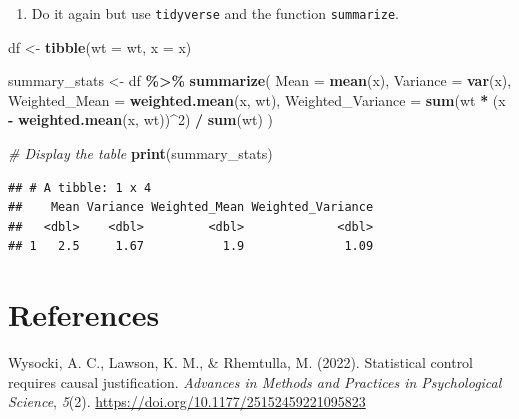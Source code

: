 \documentclass[
  doc]{apa6}
\newenvironment{Shaded}{\begin{snugshade}}{\end{snugshade}}
\newcommand{\AttributeTok}[1]{\textcolor[rgb]{0.13,0.29,0.53}{#1}}
\newcommand{\CommentTok}[1]{\textcolor[rgb]{0.56,0.35,0.01}{\textit{#1}}}
\newcommand{\DecValTok}[1]{\textcolor[rgb]{0.00,0.00,0.81}{#1}}
\newcommand{\FunctionTok}[1]{\textcolor[rgb]{0.13,0.29,0.53}{\textbf{#1}}}
\newcommand{\NormalTok}[1]{#1}
\newcommand{\OtherTok}[1]{\textcolor[rgb]{0.56,0.35,0.01}{#1}}
\newcommand{\SpecialCharTok}[1]{\textcolor[rgb]{0.81,0.36,0.00}{\textbf{#1}}}
\providecommand{\tightlist}{%
  \setlength{\itemsep}{0pt}\setlength{\parskip}{0pt}}
\newlength{\cslhangindent}
\newlength{\cslentryspacingunit} %
\newenvironment{CSLReferences}[2] %
 {%
  \setlength{\parindent}{0pt}
  \ifodd #1
  \let\oldpar\par
  \def\par{\hangindent=\cslhangindent\oldpar}
  \fi
  \setlength{\parskip}{#2\cslentryspacingunit}
 }%
 {}
\begin{document}
\begin{enumerate}
\def\labelenumi{\alph{enumi})}
\setcounter{enumi}{1}
\tightlist
\item
  Do it again but use \texttt{tidyverse} and the function \texttt{summarize}.
\end{enumerate}

\begin{Shaded}
\begin{Highlighting}[]
\NormalTok{df }\OtherTok{\textless{}{-}} \FunctionTok{tibble}\NormalTok{(}\AttributeTok{wt =}\NormalTok{ wt, }\AttributeTok{x =}\NormalTok{ x)}

\NormalTok{summary\_stats }\OtherTok{\textless{}{-}}\NormalTok{ df }\SpecialCharTok{\%\textgreater{}\%}
  \FunctionTok{summarize}\NormalTok{(}
    \AttributeTok{Mean =} \FunctionTok{mean}\NormalTok{(x),}
    \AttributeTok{Variance =} \FunctionTok{var}\NormalTok{(x),}
    \AttributeTok{Weighted\_Mean =} \FunctionTok{weighted.mean}\NormalTok{(x, wt),}
    \AttributeTok{Weighted\_Variance =} \FunctionTok{sum}\NormalTok{(wt }\SpecialCharTok{*}\NormalTok{ (x }\SpecialCharTok{{-}} \FunctionTok{weighted.mean}\NormalTok{(x, wt))}\SpecialCharTok{\^{}}\DecValTok{2}\NormalTok{) }\SpecialCharTok{/} \FunctionTok{sum}\NormalTok{(wt)}
\NormalTok{  )}

\CommentTok{\# Display the table}
\FunctionTok{print}\NormalTok{(summary\_stats)}
\end{Highlighting}
\end{Shaded}

\begin{verbatim}
## # A tibble: 1 x 4
##    Mean Variance Weighted_Mean Weighted_Variance
##   <dbl>    <dbl>         <dbl>             <dbl>
## 1   2.5     1.67           1.9              1.09
\end{verbatim}

\hypertarget{references}{%
\section*{References}\label{references}}

\hypertarget{refs}{}
\begin{CSLReferences}{1}{0}
\leavevmode{}%
Wysocki, A. C., Lawson, K. M., \& Rhemtulla, M. (2022). Statistical control requires causal justification. \emph{Advances in Methods and Practices in Psychological Science}, \emph{5}(2). \url{https://doi.org/10.1177/25152459221095823}

\end{CSLReferences}
\end{document}
